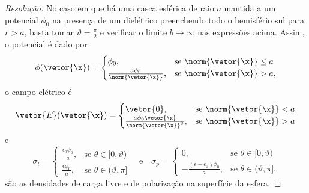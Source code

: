 \begin{proof}[Resolução]
    No caso em que há uma casca esférica de raio \(a\) mantida a um potencial \(\phi_0\) na presença de um dielétrico preenchendo todo o hemisfério sul para \(r > a\), basta tomar \(\vartheta = \frac{\pi}{2}\) e verificar o limite \(b \to \infty\) nas expressões acima. Assim, o potencial é dado por
    \begin{equation*}
        \phi(\vetor{\x}) = \begin{cases}
            \phi_0,&\text{se }\norm{\vetor{\x}} \leq a\\
            \frac{a\phi_0}{\norm{\vetor{\x}}},&\text{se }\norm{\vetor{\x}} > a,
        \end{cases}
    \end{equation*}
    o campo elétrico é
    \begin{equation*}
        \vetor{E}(\vetor{\x}) = \begin{cases}
            \vetor{0},&\text{se }\norm{\vetor{\x}} < a\\
            \frac{a\phi_0 \vetor{\x}}{\norm{\vetor{\x}}^3},&\text{se }\norm{\vetor{\x}} > a
        \end{cases}
    \end{equation*}
    e
    \begin{equation*}
        \sigma_l = \begin{cases}
            \frac{\epsilon_0 \phi_0}{a},&\text{se }\theta \in [0, \vartheta)\\
            \frac{\epsilon \phi_0}{a}, &\text{se }\theta \in (\vartheta, \pi]
        \end{cases}
        \quad\text{e}\quad
        \sigma_p = \begin{cases}
            0,&\text{se }\theta \in [0, \vartheta)\\
            -\frac{(\epsilon - \epsilon_0) \phi_0}{a}, &\text{se }\theta \in (\vartheta, \pi].
        \end{cases}
    \end{equation*}
    são as densidades de carga livre e de polarização na superfície da esfera.
\end{proof}
